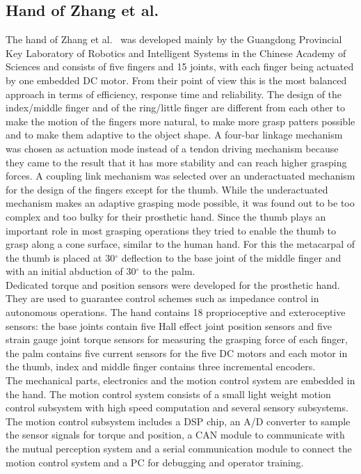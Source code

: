 \documentclass[a4paper, 10pt, conference]{ieeeconf}      %
\begin{document}
\subsection{Hand of Zhang et al.}

The hand of Zhang et al.~\cite{zhang} was developed mainly by the Guangdong Provincial Key Laboratory of Robotics and Intelligent Systems in the Chinese Academy of Sciences and consists of five fingers and 15 joints, with each finger being actuated by one embedded DC motor. From their point of view this is the most balanced approach in terms of efficiency, response time and reliability. The design of the index/middle finger and of the ring/little finger are different from each other to make the motion of the fingers more natural, to make more grasp patters possible and to make them adaptive to the object shape. A four-bar linkage mechanism was chosen as actuation mode instead of a tendon driving mechanism because they came to the result that it has more stability and can reach higher grasping forces. A coupling link mechanism was selected over an underactuated mechanism for the design of the fingers except for the thumb. While the underactuated mechanism makes an adaptive grasping mode possible, it was found out to be too complex and too bulky for their prosthetic hand. Since the thumb plays an important role in most grasping operations they tried to enable the thumb to grasp along a cone surface, similar to the human hand. For this the metacarpal of the thumb is placed at 30$^\circ$ deflection to the base joint of the middle finger and with an initial abduction of 30$^\circ$ to the palm.\\
Dedicated torque and position sensors were developed for the prosthetic hand. They are used to guarantee control schemes such as impedance control in autonomous operations. The hand contains 18 proprioceptive and exteroceptive sensors: the base joints contain five Hall effect joint position sensors and five strain gauge joint torque sensors for measuring the grasping force of each finger, the palm contains five current sensors for the five DC motors and each motor in the thumb, index and middle finger contains three incremental encoders.\\
The mechanical parts, electronics and the motion control system are embedded in the hand. The motion control system consists of a small light weight motion control subsystem with high speed computation and several sensory subsystems. The motion control subsystem includes a DSP chip, an A/D converter to sample the sensor signals for torque and position, a CAN module to communicate with the mutual perception system and a serial communication module to connect the motion control system and a PC for debugging and operator training.\\
\end{document}
